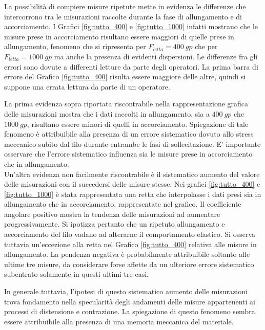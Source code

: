 \documentclass[a4paper,11pt,oneside]{article}
\begin{document}
La possibilità di compiere misure ripetute mette in evidenza le differenze che intercorrono tra le misurazioni raccolte durante la fase di allungamento e di accorciamento. I Grafici \ref{fig:tutto_400} e \ref{fig:tutto_1000} infatti mostrano che le misure prese in accorciamento risultano essere maggiori di quelle prese in allungamento, fenomeno che si ripresenta per $F_{letta}=\SI{400}{gp}$ che per $F_{letta}=\SI{1000}{gp}$ ma anche la presenza di evidenti dispersioni. Le differenze fra gli errori sono dovute a differenti letture da parte degli operatori. La prima barra di errore del Grafico \ref{fig:tutto_400} risulta essere maggiore delle altre, quindi si suppone una errata lettura da parte di un operatore.

La prima evidenza sopra riportata riscontrabile nella rappresentazione grafica delle misurazioni mostra che i dati raccolti in allungamento, sia a $\SI{400}{gp}$ che $\SI{1000}{gp}$, risultano essere minori di quelli in accorciamento. Spiegazione di tale fenomeno è attribuibile alla presenza di un errore sistematico dovuto allo stress meccanico subito dal filo durante entrambe le fasi di sollecitazione. E' importante osservare che l'errore sistematico influenza sia le misure prese in accorciamento che in allungamento.\\
Un'altra evidenza non facilmente riscontrabile è il sistematico aumento del valore delle misurazioni con il succedersi delle misure stesse. Nei grafici \ref{fig:tutto_400} e \ref{fig:tutto_1000} è stata rappresentata una retta che interpolasse i dati presi sia in allungamento che in accorciamento, rappresentate nel grafico. Il coefficiente angolare positivo mostra la tendenza delle misurazioni ad aumentare progressivamente. Si ipotizza pertanto che un ripetuto allungamento e accorciamento del filo vadano ad alterarne il comportamento elastico. Si osserva tuttavia un'eccezione alla retta nel Grafico \ref{fig:tutto_400} relativa alle misure in allungamento. La pendenza negativa è probabilmente attribuibile soltanto alle ultime tre misure, da considerare forse affette da un ulteriore errore sistematico subentrato solamente in questi ultimi tre casi.

In generale tuttavia, l'ipotesi di questo sistematico aumento delle misurazioni trova fondamento nella specularità degli andamenti delle misure appartenenti ai processi di distensione e contrazione. La spiegazione di questo fenomeno sembra essere attribuibile alla presenza di una memoria meccanica del materiale.\\
\end{document}
